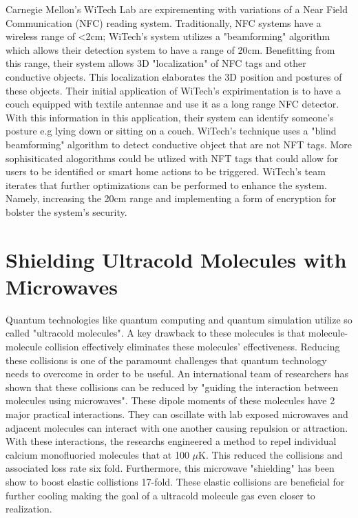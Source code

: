\documentclass{article}
\begin{document}
Carnegie Mellon's WiTech Lab are expirementing with variations of a Near Field Communication (NFC) reading system.
Traditionally, NFC systems have a wireless range of <2cm; WiTech's system utilizes a "beamforming" algorithm
which allows their detection system to have a range of 20cm.
Benefitting from this range, their system allows 3D "localization" of NFC tags and other conductive objects. 
This localization elaborates the 3D position and
postures of these objects.
Their initial application of WiTech's expirimentation is to have a couch equipped with textile 
antennae and use it as a long range NFC detector. 
With this information in this application, their system can identify someone's posture e.g lying down 
or sitting on a couch.
WiTech's technique uses a "blind beamforming" algorithm to detect conductive object that are 
not NFT tags. More sophisiticated alogorithms could be utlized with NFT tags that could
allow for users to be identified or smart home actions to be triggered. WiTech's team iterates that
further optimizations can be performed to enhance the system. Namely, 
increasing the 20cm range and implementing a 
form of encryption for bolster the system's security.



\section*{Shielding Ultracold Molecules with Microwaves}


Quantum technologies like quantum computing and quantum simulation 
utilize so called "ultracold molecules". 
A key drawback to these molecules is that molecule-molecule
collision effectively eliminates these molecules' effectiveness.
Reducing these collisions is one of the paramount challenges that 
quantum technology needs to overcome in order to be useful.
An international team of researchers has shown that these collisions
can be reduced by "guiding the interaction between molecules using
microwaves". These dipole moments of these molecules have 2 major practical interactions.
They can oscillate with lab exposed microwaves and adjacent molecules can interact with one another
causing repulsion or attraction. With these interactions, the researchs engineered a method
to repel individual calcium monofluoried molecules that at 100 $\mu$K. This reduced the collisions 
and associated loss rate six fold. Furthermore, this microwave "shielding" 
has been show to boost elastic collistions 17-fold. These elastic collisions 
are beneficial for further cooling making the goal of a ultracold molecule
gas even closer to realization.
\end{document}
